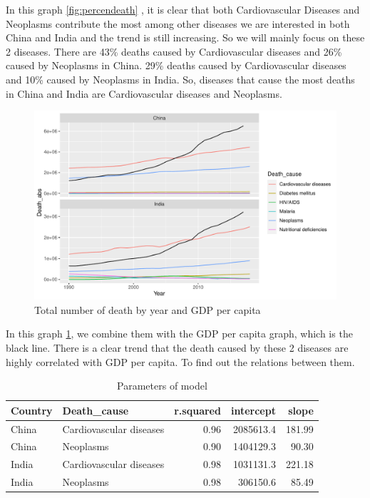\documentclass[11pt,a4paper,]{article}
\begin{document}
In this graph \ref{fig:percendeath} , it is clear that both Cardiovascular Diseases and Neoplasms contribute the most among other diseases we are interested in both China and India and the trend is still increasing. So we will mainly focus on these 2 diseases. There are 43\% deaths caused by Cardiovascular diseases and 26\% caused by Neoplasms in China. 29\% deaths caused by Cardiovascular diseases and 10\% caused by Neoplasms in India. So, diseases that cause the most deaths in China and India are Cardiovascular diseases and Neoplasms.

\begin{figure}
\centering
\includegraphics{Assignment4_files/figure-latex/totaldeath-1.pdf}
\caption{\label{fig:totaldeath}Total number of death by year and GDP per capita}
\end{figure}

In this graph \ref{fig:totaldeath}, we combine them with the GDP per capita graph, which is the black line. There is a clear trend that the death caused by these 2 diseases are highly correlated with GDP per capita. To find out the relations between them.

\begin{table}

\caption{\label{tab:modelparameter}Parameters of model}
\centering
\begin{tabular}[t]{l|l|r|r|r}
\hline
Country & Death\_cause & r.squared & intercept & slope\\
\hline
China & Cardiovascular diseases & 0.96 & 2085613.4 & 181.99\\
\hline
China & Neoplasms & 0.90 & 1404129.3 & 90.30\\
\hline
India & Cardiovascular diseases & 0.98 & 1031131.3 & 221.18\\
\hline
India & Neoplasms & 0.98 & 306150.6 & 85.49\\
\hline
\end{tabular}
\end{table}
\end{document}
